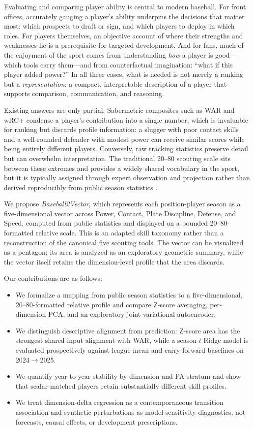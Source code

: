\documentclass[10pt,twocolumn,letterpaper]{article}
\begin{document}
Evaluating and comparing player ability is central to modern baseball. For front offices, accurately gauging a player's ability underpins the decisions that matter most: which prospects to draft or sign, and which players to deploy in which roles. For players themselves, an objective account of where their strengths and weaknesses lie is a prerequisite for targeted development. And for fans, much of the enjoyment of the sport comes from understanding \emph{how} a player is good---which tools carry them---and from counterfactual imagination: ``what if this player added power?'' In all three cases, what is needed is not merely a ranking but a \emph{representation}: a compact, interpretable description of a player that supports comparison, communication, and reasoning.

Existing answers are only partial. Sabermetric composites such as WAR and wRC+ condense a player's contribution into a single number, which is invaluable for ranking but discards profile information: a slugger with poor contact skills and a well-rounded defender with modest power can receive similar scores while being entirely different players. Conversely, raw tracking statistics preserve detail but can overwhelm interpretation. The traditional 20--80 scouting scale sits between these extremes and provides a widely shared vocabulary in the sport, but it is typically assigned through expert observation and projection rather than derived reproducibly from public season statistics \cite{mcdaniel2014}.

We propose \emph{Baseball2Vector}, which represents each position-player season as a five-dimensional vector across Power, Contact, Plate Discipline, Defense, and Speed, computed from public statistics and displayed on a bounded 20--80-formatted relative scale. This is an adapted skill taxonomy rather than a reconstruction of the canonical five scouting tools. The vector can be visualized as a pentagon; its area is analyzed as an exploratory geometric summary, while the vector itself retains the dimension-level profile that the area discards.

Our contributions are as follows:
\begin{itemize}
  \item We formalize a mapping from public season statistics to a five-dimensional, 20--80-formatted relative profile and compare Z-score averaging, per-dimension PCA, and an exploratory joint variational autoencoder.
  \item We distinguish descriptive alignment from prediction: Z-score area has the strongest shared-input alignment with WAR, while a season-$t$ Ridge model is evaluated prospectively against league-mean and carry-forward baselines on 2024$\to$2025.
  \item We quantify year-to-year stability by dimension and PA stratum and show that scalar-matched players retain substantially different skill profiles.
  \item We treat dimension-delta regression as a contemporaneous transition association and synthetic perturbations as model-sensitivity diagnostics, not forecasts, causal effects, or development prescriptions.
\end{itemize}
\end{document}
